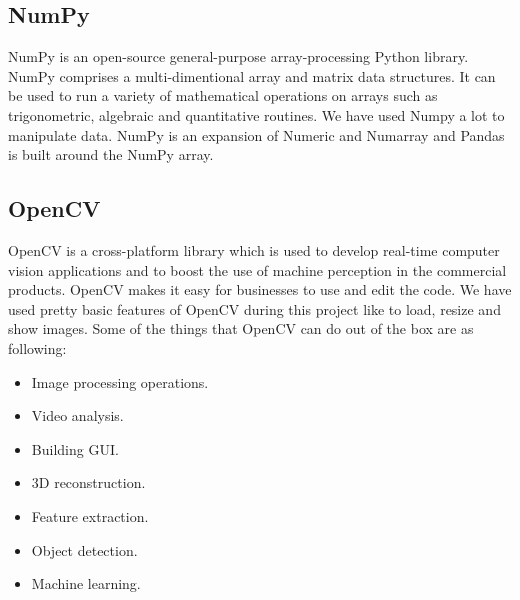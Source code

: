 \subsection{NumPy}
NumPy\cite{numpy} is an open-source general-purpose array-processing Python library. NumPy comprises a multi-dimentional array and matrix data structures. It can be used to run a variety of mathematical operations on arrays such as trigonometric, algebraic and quantitative routines. We have used Numpy a lot to manipulate data. NumPy is an expansion of Numeric and Numarray and Pandas is built around the NumPy array.
\subsection{OpenCV}
OpenCV\cite{opencv} is a cross-platform library which is used to develop real-time computer vision applications and to boost the use of machine perception in the commercial products. OpenCV makes it easy for businesses to use and edit the code. We have used pretty basic features of OpenCV during this project like to load, resize and show images. Some of the things that OpenCV can do out of the box are as following:
\begin{itemize}
  \item Image processing operations.
  \item Video analysis.
  \item Building GUI.
  \item 3D reconstruction.
  \item Feature extraction.
  \item Object detection.
  \item Machine learning.
\end{itemize}
